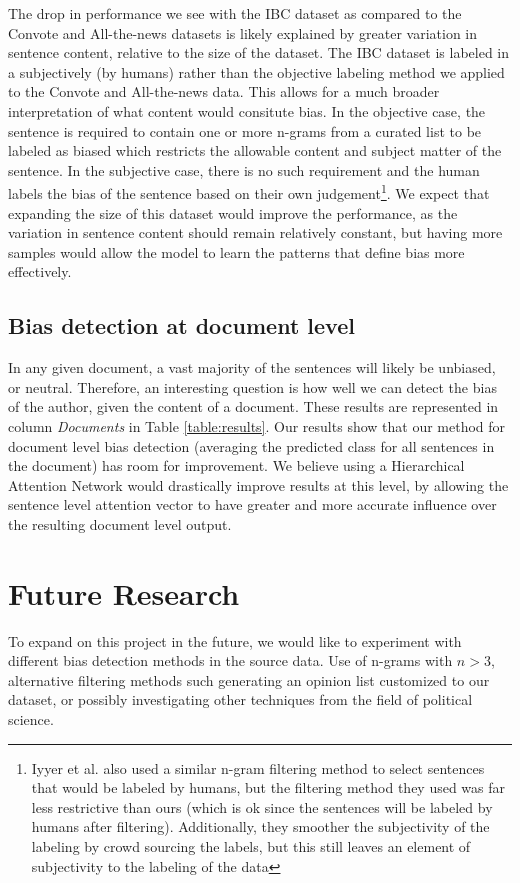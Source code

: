 \documentclass[10pt,a4paper,onecolumn]{article}
\begin{document}
The drop in performance we see with the IBC dataset as compared to the Convote and All-the-news datasets is likely explained by greater variation in sentence content, relative to the size of the dataset. The IBC dataset is labeled in a subjectively (by humans) rather than the objective labeling method we applied to the Convote and All-the-news data. This allows for a much broader interpretation of what content would consitute bias. In the objective case, the sentence is required to contain one or more n-grams from a curated list to be labeled as biased which restricts the allowable content and subject matter of the sentence. In the subjective case, there is no such requirement and the human labels the bias of the sentence based on their own judgement\footnote{Iyyer et al. also used a similar n-gram filtering method to select sentences that would be labeled by humans, but the filtering method they used was far less restrictive than ours (which is ok since the sentences will be labeled by humans after filtering). Additionally, they smoother the subjectivity of the labeling by crowd sourcing the labels, but this still leaves an element of subjectivity to the labeling of the data}. We expect that expanding  the size of this dataset would improve the performance, as the variation in sentence content should remain relatively constant, but having more samples would allow the model to learn the patterns that define bias more effectively.

\subsection{Bias detection at document level} 
In any given document, a vast majority of the sentences will likely be unbiased, or neutral. Therefore, an interesting question is how well we can detect the bias of the author, given the content of a document. These results are represented in column \textit{Documents} in Table \ref{table:results}. Our results show that our method for document level bias detection (averaging the predicted class for all sentences in the document) has room for improvement. We believe using a Hierarchical Attention Network would drastically improve results at this level, by allowing the sentence level attention vector to have greater and more accurate influence over the resulting document level output. 

\section*{Future Research}
To expand on this project in the future, we would like to experiment with different bias detection methods in the source data. Use of n-grams with $ n > 3 $, alternative filtering methods such generating an opinion list customized to our dataset, or possibly investigating other techniques from the field of political science.
\end{document}
